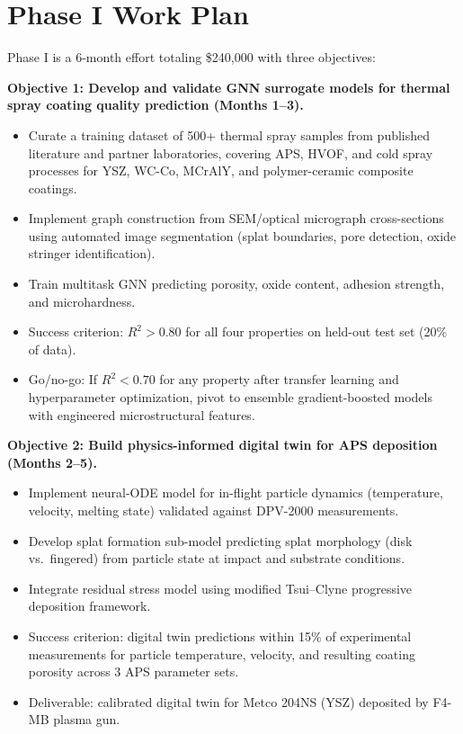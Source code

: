 \documentclass[11pt,letterpaper]{article}
\begin{document}
\section{Phase I Work Plan}
\label{sec:workplan}

Phase I is a 6-month effort totaling \$240,000 with three objectives:

\textbf{Objective 1: Develop and validate GNN surrogate models for
thermal spray coating quality prediction (Months 1--3).}
\begin{itemize}[nosep]
  \item Curate a training dataset of 500+ thermal spray samples from
        published literature and partner laboratories, covering APS,
        HVOF, and cold spray processes for YSZ, WC-Co, MCrAlY, and
        polymer-ceramic composite coatings.
  \item Implement graph construction from SEM/optical micrograph
        cross-sections using automated image segmentation (splat
        boundaries, pore detection, oxide stringer identification).
  \item Train multitask GNN predicting porosity, oxide content, adhesion
        strength, and microhardness.
  \item Success criterion: $R^2 > 0.80$ for all four properties on
        held-out test set (20\% of data).
  \item Go/no-go: If $R^2 < 0.70$ for any property after transfer
        learning and hyperparameter optimization, pivot to ensemble
        gradient-boosted models with engineered microstructural features.
\end{itemize}

\textbf{Objective 2: Build physics-informed digital twin for APS
deposition (Months 2--5).}
\begin{itemize}[nosep]
  \item Implement neural-ODE model for in-flight particle dynamics
        (temperature, velocity, melting state) validated against DPV-2000
        measurements.
  \item Develop splat formation sub-model predicting splat morphology
        (disk vs.\ fingered) from particle state at impact and substrate
        conditions.
  \item Integrate residual stress model using modified Tsui--Clyne
        progressive deposition framework.
  \item Success criterion: digital twin predictions within 15\% of
        experimental measurements for particle temperature, velocity, and
        resulting coating porosity across 3 APS parameter sets.
  \item Deliverable: calibrated digital twin for Metco 204NS (YSZ)
        deposited by F4-MB plasma gun.
\end{itemize}
\end{document}
